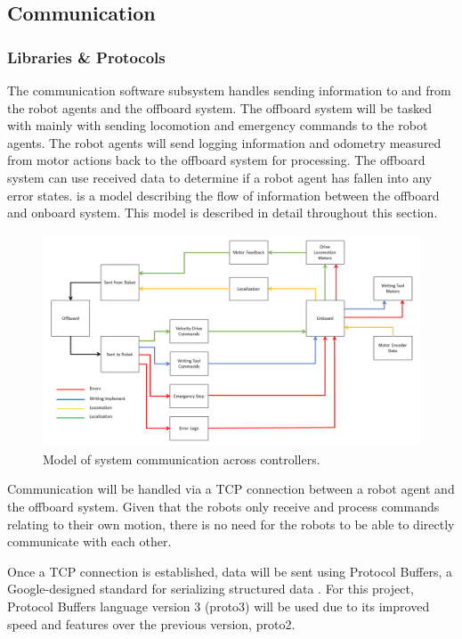 
\subsection{Communication}
\label{sec:software_comm}


\subsubsection{Libraries \& Protocols}
\label{sec:software_comm_libs}
The communication software subsystem handles sending information to and from the robot agents and the offboard system. The offboard system will be tasked with mainly with sending locomotion and emergency commands to the robot agents. The robot agents will send logging information and odometry measured from motor actions back to the offboard system for processing. The offboard system can use received data to determine if a robot agent has fallen into any error states.  is a model describing the flow of information between the offboard and onboard system. This model is described in detail throughout this section.

\begin{figure}
\centering
\includegraphics[width=0.9\columnwidth]{figs/sw_arch_communication.png}
\caption{Model of system communication across controllers.}
\label{fig:software_comm_model}
\end{figure}

Communication will be handled via a TCP connection between a robot agent and the offboard system. Given that the robots only receive and process commands relating to their own motion, there is no need for the robots to be able to directly communicate with each other.

Once a TCP connection is established, data will be sent using Protocol Buffers, a Google-designed standard for serializing structured data \cite{protobuf3}. For this project, Protocol Buffers language version 3 (proto3) will be used due to its improved speed and features over the previous version, proto2.

